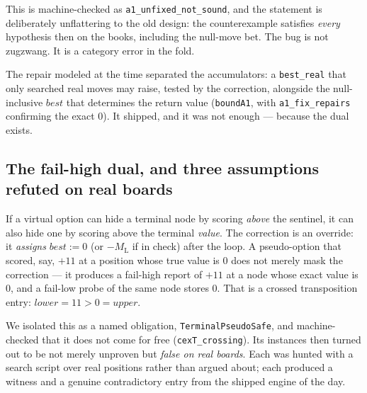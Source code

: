 \documentclass[11pt]{article}
\newcommand{\ML}{M_{\mathrm{L}}}    %
\theoremstyle{plain}
\theoremstyle{definition}
\theoremstyle{remark}
\begin{document}
This is machine-checked as \texttt{a1\_unfixed\_not\_sound}, and the
statement is deliberately unflattering to the old design: the
counterexample satisfies \emph{every} hypothesis then on the books,
including the null-move bet.  The bug is not zugzwang.  It is a
category error in the fold.

The repair modeled at the time separated the accumulators: a
\texttt{best\_real} that only searched real moves may raise, tested by
the correction, alongside the null-inclusive $\mathit{best}$ that
determines the return value (\texttt{boundA1}, with
\texttt{a1\_fix\_repairs} confirming the exact $0$).  It shipped, and
it was not enough --- because the dual exists.

\subsection{The fail-high dual, and three assumptions refuted on real boards}

If a virtual option can hide a terminal node by scoring \emph{above}
the sentinel, it can also hide one by scoring above the terminal
\emph{value}.  The correction is an override: it \emph{assigns}
$\mathit{best} := 0$ (or $-\ML$ if in check) after the loop.  A
pseudo-option that scored, say, $+11$ at a position whose true value is
$0$ does not merely mask the correction --- it produces a fail-high
report of $+11$ at a node whose exact value is $0$, and a fail-low
probe of the same node stores $0$.  That is a crossed transposition
entry: $\mathit{lower} = 11 > 0 = \mathit{upper}$.

We isolated this as a named obligation, \texttt{TerminalPseudoSafe},
and machine-checked that it does not come for free
(\texttt{cexT\_crossing}).  Its instances then turned out to be not
merely unproven but \emph{false on real boards}.  Each was hunted with
a search script over real positions rather than argued about; each
produced a witness and a genuine contradictory entry from the shipped
engine of the day.
\end{document}

